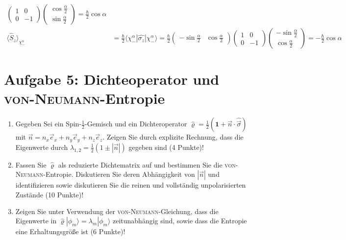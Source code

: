 \documentclass[a4paper,12pt]{article}
\newcommand{\bra}{}
\newcommand{\braket}{}
\newcommand{\kla}{}
\newcommand{\Ket}{}
\begin{document}
\begin{enumerate}
\begin{align*}
\begin{pmatrix}
1 & 0 \\ 0 & -1
\end{pmatrix}\begin{pmatrix}
\cos\frac{\alpha}{2} \\ \sin\frac{\alpha}{2}
\end{pmatrix}=\frac{\hbar}{2}\cos\alpha\\
\bra\langle {\hat{S}_z}\rangle_{\chi_-^\alpha}&=\frac{\hbar}{2}\braket\langle {\chi_-^\alpha} | {\hat{\sigma_z}} | {\chi_-^\alpha}\rangle=\frac{\hbar}{2}\begin{pmatrix}
-\sin\frac{\alpha}{2} & \cos\frac{\alpha}{2}
\end{pmatrix}\begin{pmatrix}
1 & 0 \\ 0 & -1
\end{pmatrix}\begin{pmatrix}
-\sin\frac{\alpha}{2} \\ \cos\frac{\alpha}{2}
\end{pmatrix}=-\frac{\hbar}{2}\cos\alpha
\end{align*}
\end{enumerate}
\section*{Aufgabe 5: Dichteoperator und \textsc{von-Neumann}-Entropie}
\begin{enumerate}
\item[a)] Gegeben Sei ein Spin-$\frac{1}{2}$-Gemisch und ein Dichteroperator $\hat{\varrho}=\frac{1}{2}\kla\left( {\mathbf{1}+\vec{n}\cdot\hat{\vec{\sigma}}} \right)$ mit $\vec{n}=n_x\vec{e}_x+n_y\vec{e}_y+n_z\vec{e}_z$. Zeigen Sie durch explizite Rechnung, dass die Eigenwerte durch $\lambda_{1,2}=\frac{1}{2}(1\pm |\vec{n}|)$ gegeben sind (4 Punkte)!
\item[b)] Fassen Sie $\hat{\varrho}$ als reduzierte Dichtematrix auf und bestimmen Sie die \textsc{von-Neumann}-Entropie. Diskutieren Sie deren Abhängigkeit von $|\vec{n}|$ und identifizieren sowie diskutieren Sie die reinen und vollständig unpolarisierten Zustände (10 Punkte)!
\item[c)] Zeigen Sie unter Verwendung der \textsc{von-Neumann}-Gleichung, dass die Eigenwerte in $\hat{\varrho}\Ket | {\phi_m} \rangle=\lambda_m\Ket | {\phi_m} \rangle$ zeitunabhängig sind, sowie dass die Entropie eine Erhaltungsgröße ist (6 Punkte)!
\end{enumerate}
\end{document}
